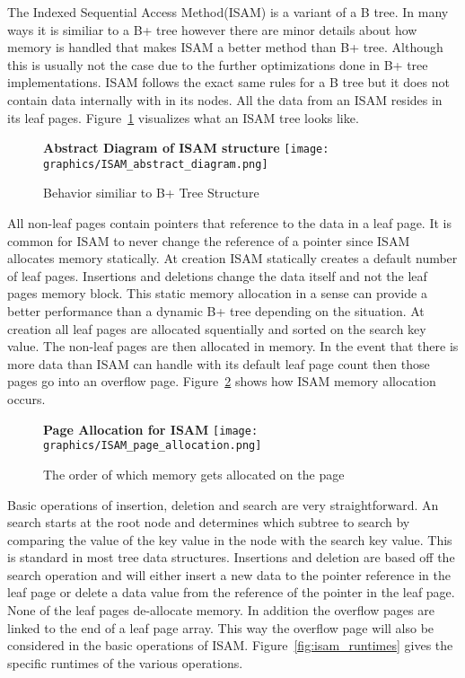\documentclass[letterpaper, 12pt]{article}
\begin{document}
The Indexed Sequential Access Method(ISAM) is a variant of a B tree. In many ways it is similiar to a B+ tree 
however there are minor details about how memory is handled that makes ISAM a better method than B+ tree. 
Although this is usually not the case due to the further optimizations done in B+ tree implementations. 
ISAM follows the exact same rules for a B tree but it does not contain data internally with in its nodes. 
All the data from an ISAM resides in its leaf pages. Figure~\ref{fig:isam_visual} visualizes what an ISAM tree
looks like.
\par\vspace{\baselineskip}

\begin{figure}
  \centering
  \textbf{Abstract Diagram of ISAM structure}
  \texttt{[image: graphics/ISAM\_abstract\_diagram.png]}
  \cite{ramakrishnan2000database}
  \caption{Behavior similiar to B+ Tree Structure}
  \label{fig:isam_visual}
\end{figure}

All non-leaf pages contain pointers that reference to the data in a leaf page. It is common for
ISAM to never change the reference of a pointer since ISAM allocates memory statically. At creation
ISAM statically creates a default number of leaf pages. Insertions and deletions change the data
itself and not the leaf pages memory block. This static memory allocation in a sense can
provide a better performance than a dynamic B+ tree depending on the situation. At creation all
leaf pages are allocated squentially and sorted on the search key value. The non-leaf pages
are then allocated in memory. In the event that there is more data than ISAM can handle with its
default leaf page count then those pages go into an overflow page. Figure~\ref{fig:isam_memory} shows 
how ISAM memory allocation occurs.
\par\vspace{\baselineskip}

\begin{figure}
  \centering
  \textbf{Page Allocation for ISAM}
  \texttt{[image: graphics/ISAM\_page\_allocation.png]}
  \cite{ramakrishnan2000database}
  \caption{The order of which memory gets allocated on the page}
  \label{fig:isam_memory}
\end{figure}

Basic operations of insertion, deletion and search are very straightforward. An search starts at the
root node and determines which subtree to search by comparing the value of the key value in the node
with the search key value. This is standard in most tree data structures. Insertions and deletion are
based off the search operation and will either insert a new data to the pointer reference in the leaf
page or delete a data value from the reference of the pointer in the leaf page. None of the leaf
pages de-allocate memory. In addition the overflow pages are linked to the end of a leaf page array.
This way the overflow page will also be considered in the basic operations of ISAM. Figure~\ref{fig:isam_runtimes}
gives the specific runtimes of the various operations.
\par\vspace{\baselineskip}
\end{document}

